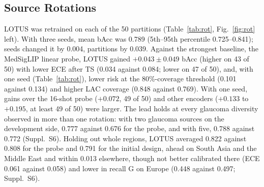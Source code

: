 \documentclass[runningheads]{llncs}
\newcommand{\sups}[1]{Suppl.~S#1}
\begin{document}
\subsection{Source Rotations}\label{sec:rot}
\begin{table}[tb]
\caption{Fifty source rotations, same partitions for all methods, TS on each rotation's Cal-A, one training seed per rotation. Risk: at the threshold for 80\% coverage fitted on Cal-B. LAC: coverage at nominal 0.90. LP: linear probe with class-weighted cross-entropy. Last four columns: LOTUS minus the row, and rotations where LOTUS is better. With three seeds, LOTUS against the MedSigLIP LP gives $+0.043$ bAcc (higher on 43/50) and lower ECE on 47/50 (\sups{6}).}\label{tab:rot}
\centering\scriptsize\setlength{\tabcolsep}{2.5pt}
\end{table}

LOTUS was retrained on each of the 50 partitions (Table~\ref{tab:rot}, Fig.~\ref{fig:rot} left). With three seeds, mean bAcc was 0.789 (5th--95th percentile 0.725--0.841); seeds changed it by 0.004, partitions by 0.039. Against the strongest baseline, the MedSigLIP linear probe, LOTUS gained $+0.043\pm0.049$ bAcc (higher on 43 of 50) with lower ECE after TS (0.034 against 0.084; lower on 47 of 50), and, with one seed (Table~\ref{tab:rot}), lower risk at the 80\%-coverage threshold (0.101 against 0.134) and higher LAC coverage (0.848 against 0.769). With one seed, gains over the 16-shot probe ($+0.072$, 49 of 50) and other encoders ($+0.133$ to $+0.195$, at least 49 of 50) were larger. The lead holds at every glaucoma diversity observed in more than one rotation: with two glaucoma sources on the development side, 0.777 against 0.676 for the probe, and with five, 0.788 against 0.772 (\sups{6}). Holding out whole regions, LOTUS averaged 0.822 against 0.808 for the probe and 0.791 for the initial design, ahead on South Asia and the Middle East and within 0.013 elsewhere, though not better calibrated there (ECE 0.061 against 0.058) and lower in recall G on Europe (0.448 against 0.497; \sups{6}).
\end{document}
